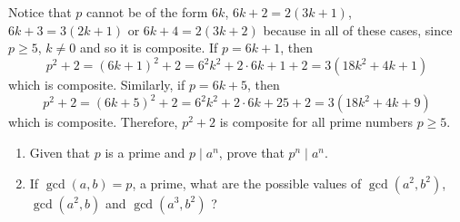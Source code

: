\begin{solution}
    Notice that $p$ cannot be of the form $6k$, $6k+2 = 2(3k+1)$, $6k+3 = 3(2k+1)$ or $6k+4 = 2(3k+2)$ because in all of these cases, since $p \geq 5$, $k \neq 0$ and so it is composite. If $p = 6k+1$, then
    $$p^2 +2 = (6k+1)^2 + 2 = 6^2k^2 + 2\cdot 6k + 1 + 2 = 3(18k^2 + 4k + 1)$$
    which is composite. Similarly, if $p = 6k+5$, then 
    $$p^2 +2 = (6k+5)^2 + 2 = 6^2k^2 + 2\cdot 6k + 25 + 2 = 3(18k^2 + 4k + 9)$$
    which is composite. Therefore, $p^2 + 2$ is composite for all prime numbers $p \geq 5$.\\
\end{solution}

\begin{exercise}
    \begin{enumerate}
        \item Given that $p$ is a prime and $p \mid a^n$, prove that $p^n \mid a^n$.
        \item If $\gcd(a,b) = p$, a prime, what are the possible values of $\gcd(a^2, b^2)$, $\gcd(a^2, b)$ and $\gcd(a^3, b^2)$ ?
    \end{enumerate}
\end{exercise}

